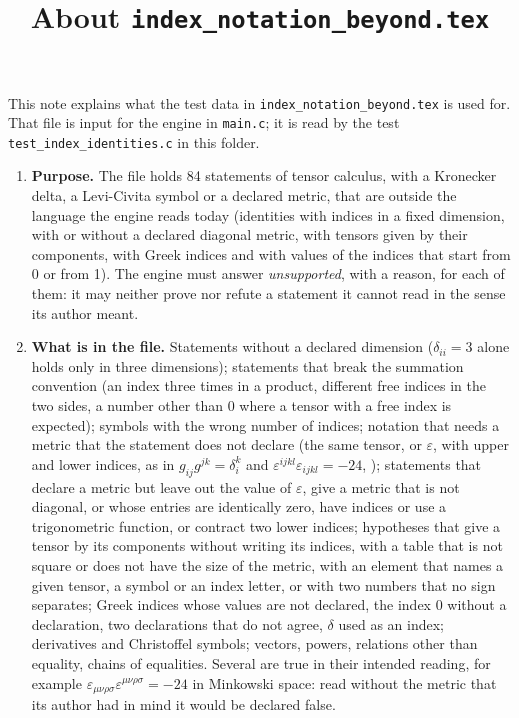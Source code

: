 \documentclass[11pt,a4paper]{article}
\title{About \texttt{index\_notation\_beyond.tex}}
\author{}
\date{}
\begin{document}
\maketitle
This note explains what the test data in \texttt{index\_notation\_beyond.tex} is used for. That file is input for the engine in \texttt{main.c}; it is read by the test \texttt{test\_index\_identities.c} in this folder.

\begin{enumerate}
\item \textbf{Purpose.} The file holds 84 statements of tensor calculus, with a Kronecker delta, a Levi-Civita symbol or a declared metric, that are outside the language the engine reads today (identities with indices in a fixed dimension, with or without a declared diagonal metric, with tensors given by their components, with Greek indices and with values of the indices that start from 0 or from 1). The engine must answer \emph{unsupported}, with a reason, for each of them: it may neither prove nor refute a statement it cannot read in the sense its author meant.

\item \textbf{What is in the file.} Statements without a declared dimension ($\delta_{ii} = 3$ alone holds only in three dimensions); statements that break the summation convention (an index three times in a product, different free indices in the two sides, a number other than $0$ where a tensor with a free index is expected); symbols with the wrong number of indices; notation that needs a metric that the statement does not declare (the same tensor, or $\varepsilon$, with upper and lower indices, as in $g_{ij} g^{jk} = \delta_{i}^{k}$ and $\varepsilon^{ijkl}\varepsilon_{ijkl} = -24$, ); statements that declare a metric but leave out the value of $\varepsilon$, give a metric that is not diagonal, or whose entries are identically zero, have indices or use a trigonometric function, or contract two lower indices; hypotheses that give a tensor by its components without writing its indices, with a table that is not square or does not have the size of the metric, with an element that names a given tensor, a symbol or an index letter, or with two numbers that no sign separates; Greek indices whose values are not declared, the index $0$ without a declaration, two declarations that do not agree, $\delta$ used as an index; derivatives and Christoffel symbols; vectors, powers, relations other than equality, chains of equalities. Several are true in their intended reading, for example $\varepsilon_{\mu\nu\rho\sigma}\varepsilon^{\mu\nu\rho\sigma} = -24$ in Minkowski space: read without the metric that its author had in mind it would be declared false.


\end{enumerate}
\end{document}
